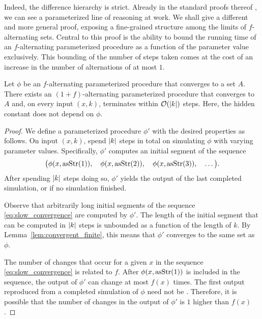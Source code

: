 Indeed, the difference hierarchy is strict.
Already in the standard proofs thereof \parencite{arslanov1997degree,ershov1968hierarchyi,putnam1965trial}, we can see a parameterized line of reasoning at work.
We shall give a different and more general proof, exposing a fine-grained structure among the limits of $f$-alternating sets.
Central to this proof is the ability to bound the running time of an $f$-alternating parameterized procedure as a function of the parameter value exclusively.
This bounding of the number of steps taken comes at the cost of an increase in the number of alternations of at most $1$.
\begin{theorem}
\label{thm:slow_convergence}
  Let $\phi$ be an $f$-alternating parameterized procedure that converges to a set $A$.
  There exists an $(1 + f)$-alternating parameterized procedure that converges to $A$ and, on every input $(x, k)$, terminates within $\operatorname{\mathcal{O}}({\lvert k\rvert})$ steps.
  Here, the hidden constant does not depend on $\phi$.
\end{theorem}
\begin{proof}
  We define a parameterized procedure $\phi'$ with the desired properties as follows.
  On input $(x, k)$, spend ${\lvert k\rvert}$ steps in total on simulating $\phi$ with varying parameter values.
  Specifically, $\phi'$ computes an initial segment of the sequence
  \begin{equation}
  \label{eq:slow_convergence}
    \big(\phi(x, \operatorname{asStr}(1)),\quad \phi(x, \operatorname{asStr}(2)),\quad \phi(x, \operatorname{asStr}(3)), \quad \ldots\big).
  \end{equation}
  After spending ${\lvert k\rvert}$ steps doing so, $\phi'$ yields the output of the last completed simulation, or  if no simulation finished.

  Observe that arbitrarily long initial segments of the sequence \eqref{eq:slow_convergence} are computed by $\phi'$.
  The length of the initial segment that can be computed in ${\lvert k\rvert}$ steps is unbounded as a function of the length of $k$.
  By Lemma~\ref{lem:convergent_finite}, this means that $\phi'$ converges to the same set as $\phi$.

  The number of changes that occur for a given $x$ in the sequence \eqref{eq:slow_convergence} is related to $f$.
  After $\phi(x, \operatorname{asStr}(1))$ is included in the sequence, the output of $\phi'$ can change at most $f(x)$ times.
  The first output reproduced from a completed simulation of $\phi$ need not be .
  Therefore, it is possible that the number of changes in the output of $\phi'$ is $1$ higher than $f(x)$.
\end{proof}

